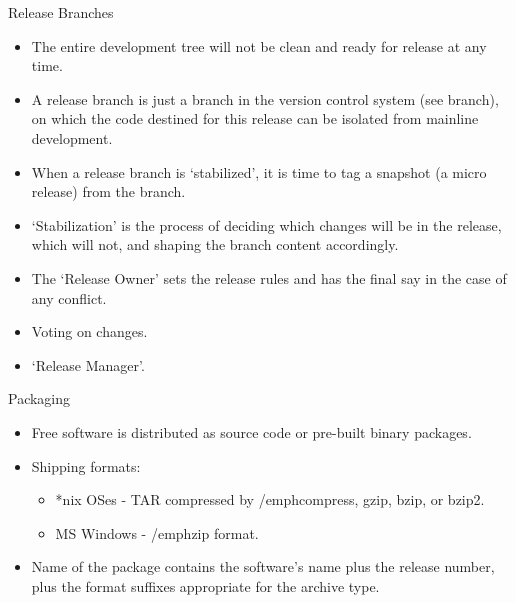\documentclass{beamer}
\begin{document}
\begin{frame}{Release Branches}
\begin{itemize}
	\item The entire development tree will not be clean and ready for release at any time. 
	\item A release branch is just a branch in the version control system (see branch), on which the code destined for this release can be isolated from mainline 	development. 
	\item When a release branch is `stabilized', it is time to tag a snapshot (a micro release) from the branch. 
	\item `Stabilization' is the process of deciding which changes will be in the release, which will not, and shaping the branch content accordingly. 
	\item The `Release Owner' sets the release rules and has the final say in the case of any conflict.
	\item Voting on changes. 
	\item `Release Manager'.
\end{itemize}
\end{frame}

\begin{frame}{Packaging}
\begin{itemize}
	\item Free software is distributed as source code or pre-built binary packages.
	\item Shipping formats:
	\begin{itemize}
		\item *nix OSes - TAR compressed by /emph{compress, gzip, bzip, or bzip2}. 
		\item MS Windows - /emph{zip} format. 
	\end{itemize}
	\item Name of the package contains the software's name plus the release number, plus the format suffixes appropriate for the archive type.
\end{itemize}
\end{frame}
\end{document}
